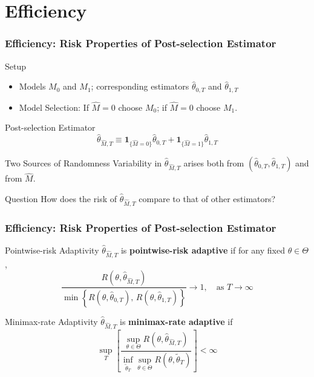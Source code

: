 \section{Efficiency}
\begin{frame}
  \frametitle{Efficiency: Risk Properties of Post-selection Estimator}


  \begin{block}{Setup}
   \begin{itemize}
      \item Models $M_0$ and $M_1$; corresponding estimators $\widehat{\theta}_{0,T}$ and $\widehat{\theta}_{1,T}$
      \item Model Selection: If $\widehat{M} = 0$ choose $M_0$; if $\widehat{M} = 0$ choose $M_1$.
    \end{itemize}
  \end{block}

  \begin{block}{Post-selection Estimator}
    \vspace{-1.5em}
    \[\widehat{\theta}_{\widehat{M},T} \equiv \mathbf{1}_{\{ \widehat{M} = 0 \}} \widehat{\theta}_{0,T} + \mathbf{1}_{\{ \widehat{M} = 1 \}}\widehat{\theta}_{1,T}\]
  \end{block}

  \vspace{-1em}

  \begin{block}{Two Sources of Randomness}
    Variability in $\widehat{\theta}_{\widehat{M},T}$ arises both from $\left(\widehat{\theta}_{0,T}, \widehat{\theta}_{1,T} \right)$ and from $\widehat{M}$.
  \end{block}

  \begin{alertblock}{Question}
    How does the risk of $\widehat{\theta}_{\widehat{M},T}$ compare to that of other estimators?
  \end{alertblock}
  
\end{frame}
\begin{frame}
  \frametitle{Efficiency: Risk Properties of Post-selection Estimator}

  \begin{block}{Pointwise-risk Adaptivity}
    $\widehat{\theta}_{\widehat{M},T}$ is \textbf{pointwise-risk adaptive} if for any fixed $\theta \in \Theta$,
    \[
      \frac{R(\theta, \widehat{\theta}_{\widehat{M},T})}{\min\left\{ R(\theta, \widehat{\theta}_{0,T}),\, R(\theta, \widehat{\theta}_{1,T}) \right\}} \rightarrow 1, \quad \mbox{as } T\rightarrow \infty
    \]
  \end{block}

  \begin{block}{Minimax-rate Adaptivity}
    $\widehat{\theta}_{\widehat{M},T}$ is \textbf{minimax-rate adaptive} if
    \[
      \sup_{T} \left[\frac{\displaystyle\sup_{\theta\in \Theta} R(\theta, \widehat{\theta}_{\widehat{M},T})}{\displaystyle\inf_{\widetilde{\theta}_{T}}\sup_{\theta \in \Theta} R(\theta, \widetilde{\theta}_{T})}\right] < \infty
    \]
  \end{block}
\end{frame}
